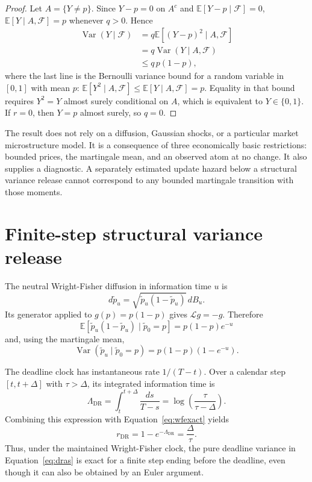 \documentclass[11pt]{article}
\newcommand{\E}{\mathbb E}
\newcommand{\Var}{\operatorname{Var}}
\newcommand{\1}{\mathbb I}
\newcommand{\F}{\mathcal F}
\begin{document}
\begin{proof}
Let $A=\{Y\ne p\}$. Since $Y-p=0$ on $A^c$ and $\E[Y-p\mid\F]=0$,
$\E[Y\mid A,\F]=p$ whenever $q>0$. Hence
\begin{align}
\Var(Y\mid\F)
&=q\E[(Y-p)^2\mid A,\F]\\
&=q\Var(Y\mid A,\F)\\
&\le q\,p(1-p),
\end{align}
where the last line is the Bernoulli variance bound for a random variable in
$[0,1]$ with mean $p$: $\E[Y^2\mid A,\F]\le\E[Y\mid A,\F]=p$. Equality in that
bound requires $Y^2=Y$ almost surely conditional on $A$, which is equivalent to
$Y\in\{0,1\}$. If $r=0$, then $Y=p$ almost surely, so $q=0$.
\end{proof}

The result does not rely on a diffusion, Gaussian shocks, or a particular
market microstructure model. It is a consequence of three economically basic
restrictions: bounded prices, the martingale mean, and an observed atom at no
change. It also supplies a diagnostic. A separately estimated update hazard
below a structural variance release cannot correspond to any bounded
martingale transition with those moments.

\section{Finite-step structural variance release}

The neutral Wright-Fisher diffusion in information time $u$ is
\begin{equation}
d\widetilde p_u=\sqrt{\widetilde p_u(1-\widetilde p_u)}\,dB_u.
\end{equation}
Its generator applied to $g(p)=p(1-p)$ gives $\mathcal Lg=-g$. Therefore
\begin{equation}
\E[\widetilde p_u(1-\widetilde p_u)\mid\widetilde p_0=p]
=p(1-p)e^{-u}
\end{equation}
and, using the martingale mean,
\begin{equation}
\Var(\widetilde p_u\mid\widetilde p_0=p)
=p(1-p)(1-e^{-u}).
\label{eq:wfexact}
\end{equation}

The deadline clock has instantaneous rate $1/(T-t)$. Over a calendar step
$[t,t+\Delta]$ with $\tau>\Delta$, its integrated information time is
\begin{equation}
\Lambda_{\mathrm{DR}}
=\int_t^{t+\Delta}\frac{ds}{T-s}
=\log\left(\frac{\tau}{\tau-\Delta}\right).
\end{equation}
Combining this expression with Equation~\eqref{eq:wfexact} yields
\begin{equation}
r_{\mathrm{DR}}=1-e^{-\Lambda_{\mathrm{DR}}}=\frac{\Delta}{\tau}.
\label{eq:drexact}
\end{equation}
Thus, under the maintained Wright-Fisher clock, the pure deadline variance in
Equation~\eqref{eq:dras} is exact for a finite step ending before the deadline,
even though it can also be obtained by an Euler argument.
\end{document}

